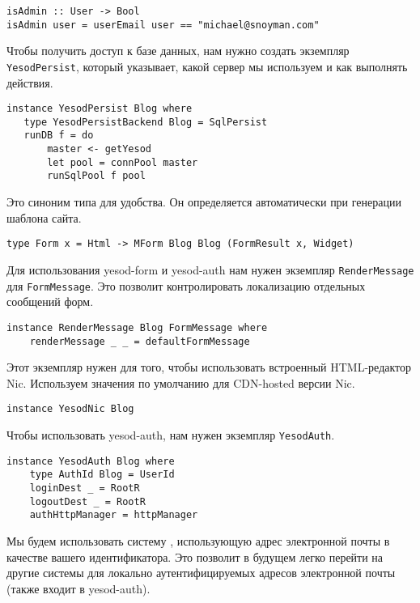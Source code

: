 \begin{lstlisting}
isAdmin :: User -> Bool
isAdmin user = userEmail user == "michael@snoyman.com"
\end{lstlisting}
 
Чтобы получить доступ к базе данных, нам нужно создать экземпляр \lstinline!YesodPersist!, который указывает, какой сервер мы используем и как выполнять действия. 
 
\begin{lstlisting}
instance YesodPersist Blog where
   type YesodPersistBackend Blog = SqlPersist
   runDB f = do 
       master <- getYesod
       let pool = connPool master
       runSqlPool f pool
\end{lstlisting}
 
Это синоним типа для удобства. Он определяется автоматически при генерации шаблона сайта. 
 
\begin{lstlisting}
type Form x = Html -> MForm Blog Blog (FormResult x, Widget)
\end{lstlisting}
 
Для использования yesod-form и yesod-auth нам нужен экземпляр \lstinline!RenderMessage! для \lstinline!FormMessage!. Это позволит контролировать локализацию отдельных сообщений форм. 
 
\begin{lstlisting}
instance RenderMessage Blog FormMessage where
    renderMessage _ _ = defaultFormMessage
\end{lstlisting}
 
Этот экземпляр нужен для того, чтобы использовать встроенный HTML-редактор Nic. Используем значения по умолчанию для CDN-hosted версии Nic.
 
\begin{lstlisting}
instance YesodNic Blog
\end{lstlisting}
 
Чтобы использовать yesod-auth, нам нужен экземпляр \lstinline!YesodAuth!. 
 
\begin{lstlisting}
instance YesodAuth Blog where
    type AuthId Blog = UserId
    loginDest _ = RootR
    logoutDest _ = RootR
    authHttpManager = httpManager
\end{lstlisting}

Мы будем использовать систему , использующую адрес электронной почты в качестве вашего идентификатора. Это позволит в будущем легко перейти на другие системы для локально аутентифицируемых адресов электронной почты (также входит в yesod-auth).
 
